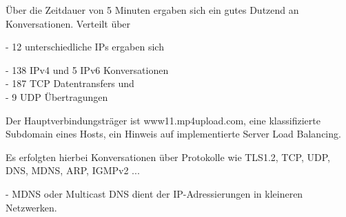 \documentclass[11pt]{article}
\begin{document}
\begin{enumerate}
\begin{enumerate}[\thesection .1]
            Über die Zeitdauer von 5 Minuten ergaben sich ein gutes Dutzend an Konversationen.
            Verteilt über
            \begin{addmargin}[1em]{1em}
                - 12 unterschiedliche IPs ergaben sich
                \begin{addmargin}[1em]{1em}
                    - 138 IPv4 und 5 IPv6 Konversationen\\
                    - 187 TCP Datentransfers und \\
                    - 9 UDP Übertragungen\\
                \end{addmargin}
            \end{addmargin}
            Der Hauptverbindungsträger ist www11.mp4upload.com, eine klassifizierte Subdomain eines Hosts, ein Hinweis auf implementierte Server Load Balancing.

            Es erfolgten hierbei Konversationen über Protokolle wie TLS1.2, TCP, UDP, DNS, MDNS, ARP, IGMPv2 ...
            \begin{addmargin}[1em]{1em}
                - MDNS oder Multicast DNS dient der IP-Adressierungen in kleineren Netzwerken.
            \end{addmargin}
        \end{enumerate}
    \end{enumerate}
\end{document}
